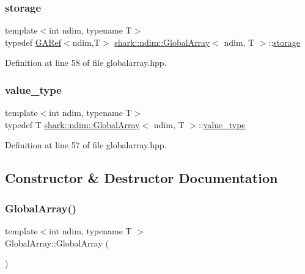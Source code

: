 \subsubsection{\texorpdfstring{storage}{storage}}
{\footnotesize\ttfamily template$<$int ndim, typename T$>$ \\
typedef \hyperlink{classshark_1_1ndim_1_1_g_a_ref}{G\+A\+Ref}$<$ndim,T$>$ \hyperlink{classshark_1_1ndim_1_1_global_array}{shark\+::ndim\+::\+Global\+Array}$<$ ndim, T $>$\+::\hyperlink{classshark_1_1ndim_1_1_global_array_a776d645cf4cd4ca129af3b082d139936}{storage}}



Definition at line 58 of file globalarray.\+hpp.

\hypertarget{classshark_1_1ndim_1_1_global_array_ac2471050153d015a155f4c7106ae5b7c}{}\label{classshark_1_1ndim_1_1_global_array_ac2471050153d015a155f4c7106ae5b7c} 
\subsubsection{\texorpdfstring{value\+\_\+type}{value\_type}}
{\footnotesize\ttfamily template$<$int ndim, typename T$>$ \\
typedef T \hyperlink{classshark_1_1ndim_1_1_global_array}{shark\+::ndim\+::\+Global\+Array}$<$ ndim, T $>$\+::\hyperlink{classshark_1_1ndim_1_1_global_array_ac2471050153d015a155f4c7106ae5b7c}{value\+\_\+type}}



Definition at line 57 of file globalarray.\+hpp.



\subsection{Constructor \& Destructor Documentation}
\hypertarget{classshark_1_1ndim_1_1_global_array_a5ab08686e28785763adac3fa73673f84}{}\label{classshark_1_1ndim_1_1_global_array_a5ab08686e28785763adac3fa73673f84} 
\subsubsection{\texorpdfstring{Global\+Array()}{GlobalArray()}\hspace{0.1cm}{\footnotesize\ttfamily [1/5]}}
{\footnotesize\ttfamily template$<$int ndim, typename T $>$ \\
Global\+Array\+::\+Global\+Array (\begin{DoxyParamCaption}{ }\end{DoxyParamCaption})}

